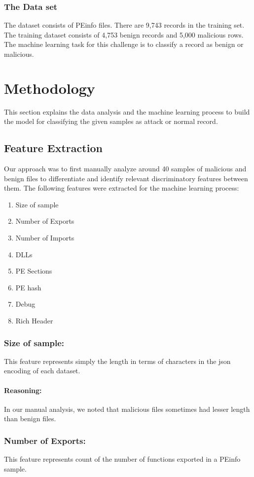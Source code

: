 \documentclass{llncs}
\begin{document}
\subsubsection{The Data set}
The dataset consists of PEinfo files. There are 9,743 records in the training set. The training dataset consists of 4,753 benign records and 5,000 malicious rows. The machine learning task for this challenge is to classify a record as benign or malicious.

\section{Methodology}
This section explains the data analysis and the machine learning process to build the model for classifying the given samples as attack  or normal record. 

\subsection{Feature Extraction}
Our approach was to first manually analyze around 40 samples of malicious and benign files to differentiate and identify relevant discriminatory features between them. The following features were extracted for the machine learning process:
\begin{enumerate}
	\item Size of sample
	\item Number of Exports
	\item Number of Imports
	\item DLLs 
	\item PE Sections
	\item PE hash
	\item Debug
	\item Rich Header
\end{enumerate}

\subsubsection{Size of sample:}
This feature represents simply the length in terms of characters in the json encoding of each dataset.  
\paragraph{Reasoning:}
In our manual analysis, we noted that malicious files sometimes had lesser length than benign files. 

\subsubsection{Number of Exports:}
This feature represents count of the number of functions exported in a PEinfo sample. 
\end{document}
